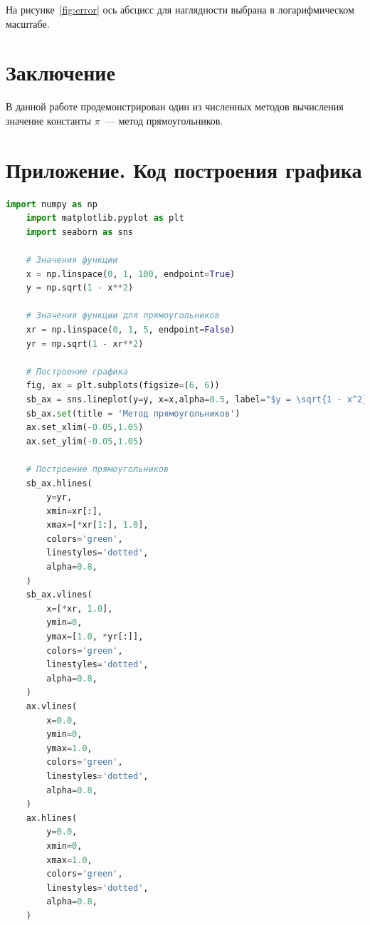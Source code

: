\documentclass[a4paper,12pt]{article}
\begin{document}
На рисунке~\ref{fig:error} ось абсцисс для наглядности выбрана в логарифмическом масштабе.

\section{Заключение}

В данной работе продемонстрирован один из численных методов вычисления значение константы $\pi$~--- метод прямоугольников.

\pagebreak

\section{Приложение. Код построения графика}

\begin{lstlisting}[language=Python, caption=Код построения рис.\ref{left_rect}]
    import numpy as np
    import matplotlib.pyplot as plt
    import seaborn as sns

    # Значения функции
    x = np.linspace(0, 1, 100, endpoint=True)
    y = np.sqrt(1 - x**2)

    # Значения функции для прямоугольников
    xr = np.linspace(0, 1, 5, endpoint=False)
    yr = np.sqrt(1 - xr**2)

    # Построение графика
    fig, ax = plt.subplots(figsize=(6, 6))
    sb_ax = sns.lineplot(y=y, x=x,alpha=0.5, label="$y = \sqrt{1 - x^2}$")
    sb_ax.set(title = 'Метод прямоугольников')
    ax.set_xlim(-0.05,1.05)
    ax.set_ylim(-0.05,1.05)

    # Построение прямоугольников
    sb_ax.hlines(
        y=yr,
        xmin=xr[:],
        xmax=[*xr[1:], 1.0],
        colors='green',
        linestyles='dotted',
        alpha=0.8,
    )
    sb_ax.vlines(
        x=[*xr, 1.0],
        ymin=0,
        ymax=[1.0, *yr[:]],
        colors='green',
        linestyles='dotted',
        alpha=0.8,
    )
    ax.vlines(
        x=0.0,
        ymin=0,
        ymax=1.0,
        colors='green',
        linestyles='dotted',
        alpha=0.8,
    )
    ax.hlines(
        y=0.0,
        xmin=0,
        xmax=1.0,
        colors='green',
        linestyles='dotted',
        alpha=0.8,
    )    
\end{lstlisting}


\listoffigures

\listoftables
\end{document}

